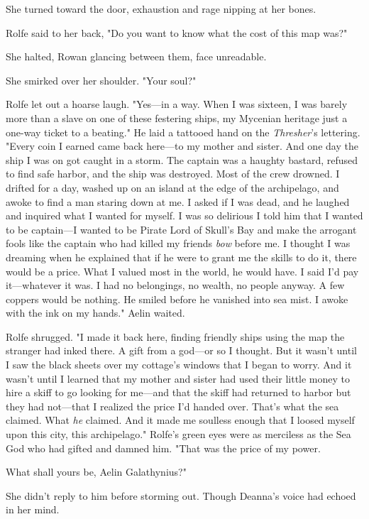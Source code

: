 She turned toward the door, exhaustion and rage nipping at her bones.

Rolfe said to her back, "Do you want to know what the cost of this map was?"

She halted, Rowan glancing between them, face unreadable.

She smirked over her shoulder.
"Your soul?"

Rolfe let out a hoarse laugh.
"Yes---in a way.
When I was sixteen, I was barely more than a slave on one of these festering ships, my Mycenian heritage just a one-way ticket to a beating."
He laid a tattooed hand on the \emph{Thresher}'s lettering.
"Every coin I earned came back here---to my mother and sister.
And one day the ship I was on got caught in a storm.
The captain was a haughty bastard, refused to find safe harbor, and the ship was destroyed.
Most of the crew drowned.
I drifted for a day, washed up on an island at the edge of the archipelago, and awoke to find a man staring down at me.
I asked if I was dead, and he laughed and inquired what I wanted for myself.
I was so delirious I told him that I wanted to be captain---I wanted to be Pirate Lord of Skull's Bay and make the arrogant fools like the captain who had killed my friends \emph{bow} before me.
I thought I was dreaming when he explained that if he were to grant me the skills to do it, there would be a price.
What I valued most in the world, he would have.
I said I'd pay it---whatever it was.
I had no belongings, no wealth, no people anyway.
A few coppers would be nothing.
He smiled before he vanished into sea mist.
I awoke with the ink on my hands."
Aelin waited.

Rolfe shrugged.
"I made it back here, finding friendly ships using the map the stranger had inked there.
A gift from a god---or so I thought.
But it wasn't until I saw the black sheets over my cottage's windows that I began to worry.
And it wasn't until I learned that my mother and sister had used their little money to hire a skiff to go looking for me---and that the skiff had returned to harbor but they had not---that I realized the price I'd handed over.
That's what the sea claimed.
What \emph{he} claimed.
And it made me soulless enough that I loosed myself upon this city, this archipelago."
Rolfe's green eyes were as merciless as the Sea God who had gifted and damned him.
"That was the price of my power.

What shall yours be, Aelin Galathynius?"

She didn't reply to him before storming out.
Though Deanna's voice had echoed in her mind.

